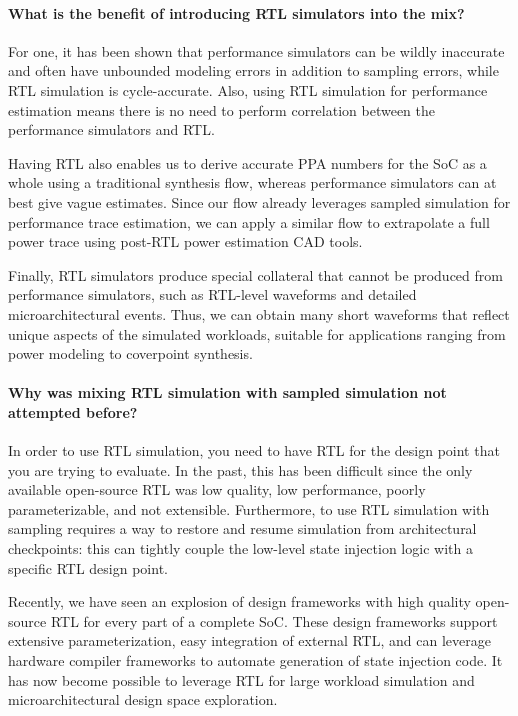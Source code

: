 \documentclass[sigplan,nonacm,10pt]{acmart}
\begin{document}
\paragraph{What is the benefit of introducing RTL simulators into the mix?}

For one, it has been shown that performance simulators can be wildly inaccurate\cite{arch_sim_considered_harmful, arch_sim_survey} and often have unbounded modeling errors in addition to sampling errors, while RTL simulation is cycle-accurate.
Also, using RTL simulation for performance estimation means there is no need to perform correlation between the performance simulators and RTL.

Having RTL also enables us to derive accurate PPA numbers for the SoC as a whole using a traditional synthesis flow, whereas performance simulators can at best give vague estimates.
Since our flow already leverages sampled simulation for performance trace estimation, we can apply a similar flow to extrapolate a full power trace using post-RTL power estimation CAD tools.

Finally, RTL simulators produce special collateral that cannot be produced from performance simulators, such as RTL-level waveforms and detailed microarchitectural events.
Thus, we can obtain many short waveforms that reflect unique aspects of the simulated workloads, suitable for applications ranging from power modeling to coverpoint synthesis.

\paragraph{Why was mixing RTL simulation with sampled simulation not attempted before?}


In order to use RTL simulation, you need to have RTL for the design point that you are trying to evaluate.
In the past, this has been difficult since the only available open-source RTL was low quality, low performance, poorly parameterizable, and not extensible.
Furthermore, to use RTL simulation with sampling requires a way to restore and resume simulation from architectural checkpoints: this can tightly couple the low-level state injection logic with a specific RTL design point.

Recently, we have seen an explosion of design frameworks with high quality open-source RTL for every part of a complete SoC\cite{chipyard, open_esp, openpiton, xiangshan, pulpv2, blackparrot}.
These design frameworks support extensive parameterization, easy integration of external RTL, and can leverage hardware compiler frameworks\cite{firrtl} to automate generation of state injection code.
It has now become possible to leverage RTL for large workload simulation and microarchitectural design space exploration.
\end{document}
